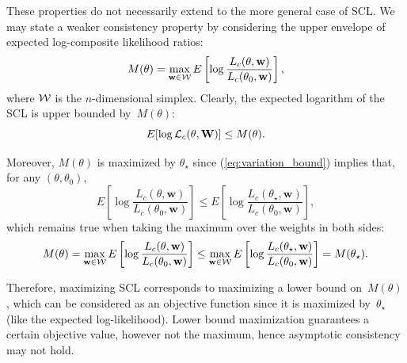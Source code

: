 \documentclass[english]{scrartcl}
\begin{document}
These properties do not necessarily extend to the more general case of SCL. We may state a weaker consistency property by considering the upper envelope of expected log-composite likelihood ratios:
$$
M(\theta) = \max_{\mathbf{w}\in{\cal W}} E\left[ \log \frac{L_c(\theta, \mathbf{w})}{L_c(\theta_0, \mathbf{w})} \right],
$$
where ${\cal W}$ is the $n$-dimensional simplex. Clearly, the expected logarithm of the SCL is upper bounded by~$M(\theta)$:
$$
E[\log {\cal L}_c(\theta, \mathbf{W})] \leq M(\theta)
.
$$

Moreover, $M(\theta)$ is maximized by $\theta_\star$ since (\ref{eq:variation_bound}) implies that, for any $(\theta,\theta_0)$,
$$
E\left[ \log \frac{L_c(\theta, \mathbf{w})}{L_c(\theta_0, \mathbf{w})} \right]
\leq
E\left[ \log \frac{L_c(\theta_\star, \mathbf{w})}{L_c(\theta_0, \mathbf{w})} \right],
$$
which remains true when taking the maximum over the weights in both sides: 
$$
M(\theta) = 
\max_{\mathbf{w}\in{\cal W}} E\left[ \log \frac{L_c(\theta, \mathbf{w})}{L_c(\theta_0, \mathbf{w})} \right]
\leq
\max_{\mathbf{w}\in{\cal W}} E\left[ \log \frac{L_c(\theta_\star, \mathbf{w})}{L_c(\theta_0, \mathbf{w})} \right]
= M(\theta_\star)
.
$$

Therefore, maximizing SCL corresponds to maximizing a lower bound on~$M(\theta)$, which can be considered as an objective function since it is maximized by~$\theta_\star$ (like the expected log-likelihood). Lower bound maximization guarantees a certain objective value, however not the maximum, hence asymptotic consistency may not hold.





\end{document}
